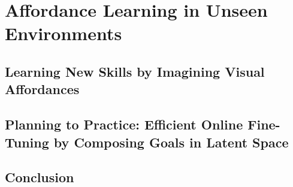 \documentclass[ titlepage,numbers=noenddot,headinclude,
                footinclude=true,cleardoublepage=empty,abstractoff,
                BCOR=5mm,paper=letter,fontsize=12pt,
                american,
                openany
                ]{scrreprt}
\begin{document}
\part{Affordance Learning in Unseen Environments}

 \chapter{Learning New Skills by Imagining Visual Affordances}\label{chapter:val}

 \chapter{Planning to Practice: Efficient Online Fine-Tuning by Composing Goals in Latent Space}\label{chapter:ptp}


\chapter{Conclusion}\label{chapter:conclusion}


\printbibliography

\appendix

% 

% 

% 
\end{document}
